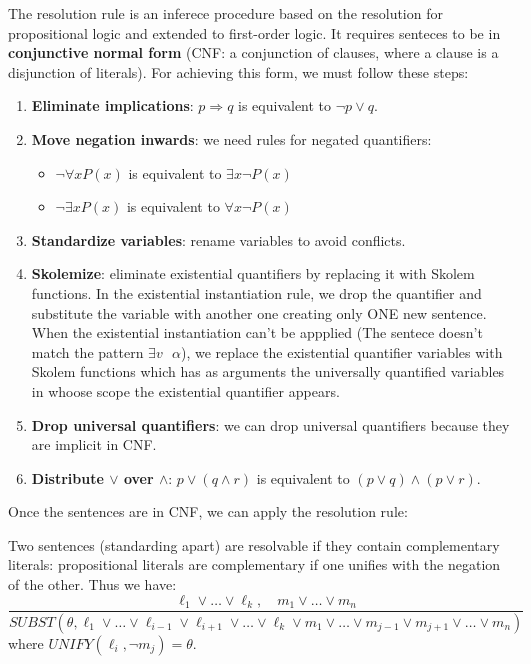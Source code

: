 \documentclass[12pt]{article}
\begin{document}
\begin{enumerate}[label=\textbf{FOL.\arabic*}]
    The resolution rule is an inferece procedure based on the resolution for propositional logic and extended to first-order logic.
    It requires senteces to  be in \textbf{conjunctive normal form} (CNF\@: a conjunction of clauses, where a clause is a disjunction of literals).
    For achieving this form, we must follow these steps:
    \begin{enumerate}
        \item \textbf{Eliminate implications}: $p\Rightarrow q$ is equivalent to $\lnot p\lor q$.
        \item \textbf{Move negation inwards}: we need rules for negated quantifiers:
        \begin{itemize}
            \item $\lnot\forall x P(x)$ is equivalent to $\exists x \lnot P(x)$
            \item $\lnot\exists x P(x)$ is equivalent to $\forall x \lnot P(x)$
        \end{itemize}
        \item \textbf{Standardize variables}: rename variables to avoid conflicts.
        \item \textbf{Skolemize}: eliminate existential quantifiers by replacing it with Skolem functions.
        In the existential instantiation rule, we drop the quantifier and substitute the variable with another one creating only ONE new sentence.
        When the existential instantiation can't be appplied (The sentece doesn't match the pattern $\exists v\text{  }\alpha$), we replace 
        the existential quantifier variables with Skolem functions which has as arguments the universally quantified variables in whoose scope the existential quantifier appears.

        \item \textbf{Drop universal quantifiers}: we can drop universal quantifiers because they are implicit in CNF\@.
        \item \textbf{Distribute $\lor$ over $\land$}: $p\lor(q\land r)$ is equivalent to $(p\lor q)\land(p\lor r)$.
    \end{enumerate}

    Once the sentences are in CNF, we can apply the resolution rule:

    Two sentences (standarding apart) are resolvable if they contain complementary literals: propositional literals are complementary if one unifies with the negation of the other.
    Thus we have:
    \begin{equation}
        \frac{\ell_1\lor\ldots\lor \ell_k,\quad m_1\lor\ldots\lor m_n}
        {SUBST(\theta,\ell_1\lor\ldots\lor\ell_{i-1}\lor\ell_{i+1}\lor\ldots\lor\ell_k\lor m_1\lor\ldots\lor m_{j-1}\lor m_{j+1}\lor\ldots\lor m_n)}
    \end{equation}
    where $UNIFY(\ell_i,\lnot m_j) = \theta$.


\end{enumerate}
\end{document}
